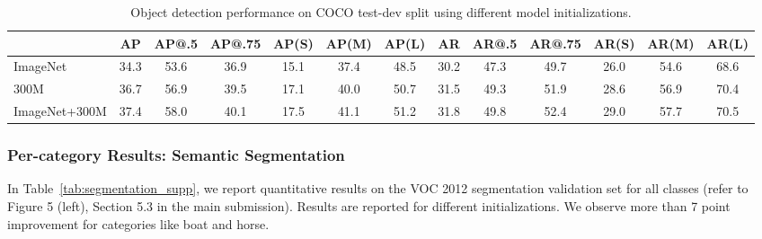 \begin{table*}[h]
\centering
\renewcommand{\arraystretch}{1.1}
\renewcommand{\tabcolsep}{1.2mm}
\begin{tabular}{@{} l | c  c  c  c  c  c | c  c  c  c  c  c @{}}

& AP & AP@.5 & AP@.75 & AP(S) & AP(M) & AP(L) & AR & AR@.5 & AR@.75 & AR(S) & AR(M) & AR(L)\\
\hline
ImageNet & 34.3 & 53.6 & 36.9 & 15.1 & 37.4 & 48.5 & 30.2 & 47.3 & 49.7 & 26.0 & 54.6 & 68.6\\
300M & 36.7 & 56.9 & 39.5 & 17.1 & 40.0 & 50.7 & 31.5 & 49.3 & 51.9 & 28.6 & 56.9 & 70.4 \\
ImageNet+300M & 37.4 & 58.0 & 40.1 & 17.5 & 41.1 & 51.2 & 31.8 & 49.8 & 52.4 & 29.0 & 57.7 & 70.5 \\
\end{tabular}
\vspace{0.1in}
\caption{Object detection performance on COCO test-dev split using different model initializations.}
\label{tab:coco_main}
\end{table*}
\vspace{-0.1in}

\subsubsection*{Per-category Results: Semantic Segmentation}
In Table~\ref{tab:segmentation_supp}, we report quantitative results on the VOC 2012 segmentation validation set for all classes (refer to Figure 5 (left), Section 5.3 in the main submission). Results are reported for different initializations. We observe more than 7 point improvement for categories like boat and horse.



